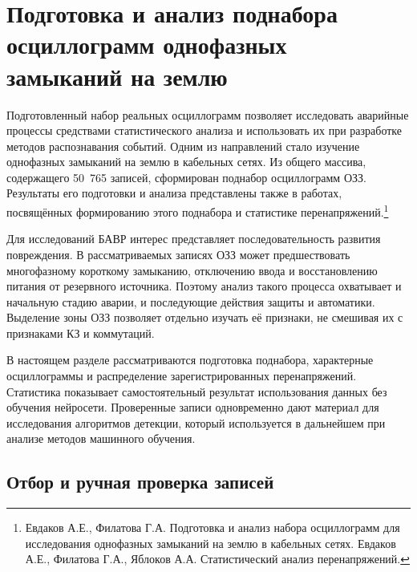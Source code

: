 \section{Подготовка и анализ поднабора осциллограмм однофазных замыканий на землю}
\label{sec:ch3_earth_fault_subset}


Подготовленный набор реальных осциллограмм позволяет исследовать
аварийные процессы средствами статистического анализа и использовать
их при разработке методов распознавания событий. Одним из направлений
стало изучение однофазных замыканий на землю в кабельных сетях.
Из общего массива, содержащего 50~765 записей, сформирован поднабор
осциллограмм ОЗЗ. Результаты его подготовки и анализа представлены
также в работах, посвящённых формированию этого поднабора
и статистике перенапряжений.\footnote{Евдаков А.Е., Филатова Г.А.
Подготовка и анализ набора осциллограмм для исследования однофазных
замыканий на землю в кабельных сетях. Евдаков А.Е.,
Филатова Г.А., Яблоков А.А. Статистический анализ перенапряжений.}

Для исследований БАВР интерес представляет последовательность
развития повреждения. В рассматриваемых записях ОЗЗ может
предшествовать многофазному короткому замыканию, отключению ввода
и восстановлению питания от резервного источника. Поэтому анализ
такого процесса охватывает и начальную стадию аварии, и последующие
действия защиты и автоматики. Выделение зоны ОЗЗ позволяет отдельно
изучать её признаки, не смешивая их с признаками КЗ и коммутаций.

В настоящем разделе рассматриваются подготовка поднабора,
характерные осциллограммы и распределение зарегистрированных
перенапряжений. Статистика показывает самостоятельный результат
использования данных без обучения нейросети. Проверенные записи
одновременно дают материал для исследования алгоритмов детекции,
который используется в дальнейшем при анализе методов машинного
обучения.

\subsection{Отбор и ручная проверка записей}


